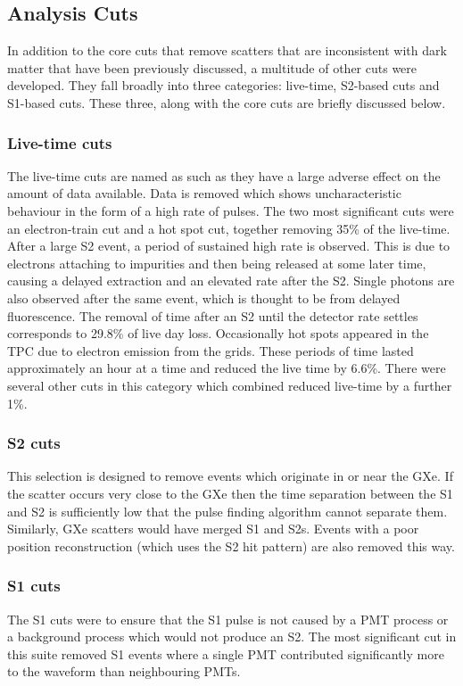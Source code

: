 \subsection{Analysis Cuts}
\par
In addition to the core cuts that remove scatters that are inconsistent with dark matter that have been previously discussed, a multitude of other cuts were developed.
They fall broadly into three categories: live-time, S2-based cuts and S1-based cuts.
These three, along with the core cuts are briefly discussed below.


\subsubsection{Live-time cuts}
The live-time cuts are named as such as they have a large adverse effect on the amount of data available.
Data is removed which shows uncharacteristic behaviour in the form of a high rate of pulses.
The two most significant cuts were an electron-train cut and a hot spot cut, together removing 35\% of the live-time.
After a large S2 event, a period of sustained high rate is observed. 
This is due to electrons attaching to impurities and then being released at some later time, causing a delayed extraction and an elevated rate after the S2.
Single photons are also observed after the same event, which is thought to be from delayed fluorescence.
The removal of time after an S2 until the detector rate settles corresponds to 29.8\% of live day loss.
Occasionally hot spots appeared in the TPC due to electron emission from the grids. 
These periods of time lasted approximately an hour at a time and reduced the live time by 6.6\%.
There were several other cuts in this category which combined reduced live-time by a further 1\%.

\subsubsection{S2 cuts}
This selection is designed to remove events which originate in or near the GXe. 
If the scatter occurs very close to the GXe then the time separation between the S1 and S2 is sufficiently low that the pulse finding algorithm cannot separate them. 
Similarly, GXe scatters would have merged S1 and S2s. 
Events with a poor position reconstruction (which uses the S2 hit pattern) are also removed this way.

\subsubsection{S1 cuts}
The S1 cuts were to ensure that the S1 pulse is not caused by a PMT process or a background process which would not produce an S2.
The most significant cut in this suite removed S1 events where a single PMT contributed significantly more to the waveform than neighbouring PMTs.

